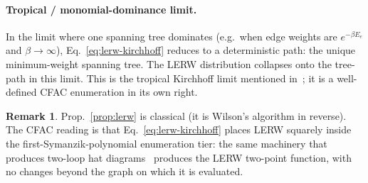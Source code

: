 \documentclass[10pt,a4paper,twocolumn]{article}
\theoremstyle{plain}
\theoremstyle{definition}
\newtheorem{remark}{Remark}
\begin{document}
\paragraph{Tropical / monomial-dominance limit.}
In the limit where one spanning tree dominates (e.g.\ when edge
weights are $e^{-\beta E_e}$ and $\beta \to \infty$),
Eq.~\eqref{eq:lerw-kirchhoff} reduces to a deterministic path: the
unique minimum-weight spanning tree.  The LERW distribution
collapses onto the tree-path in this limit.  This is the tropical
Kirchhoff limit mentioned in~\citep[\S7.1]{AmarteifioMannaC3}; it is
a well-defined CFAC enumeration in its own right.

\begin{remark}
Prop.~\ref{prop:lerw} is classical (it is Wilson's
algorithm in reverse).  The CFAC reading is that
Eq.~\eqref{eq:lerw-kirchhoff} places LERW squarely inside the
first-Symanzik-polynomial enumeration tier: the same machinery that
produces two-loop hat diagrams~\citep{Amarteifio2026LDWC} produces
the LERW two-point function, with no changes beyond the graph on
which it is evaluated.
\end{remark}
\end{document}
